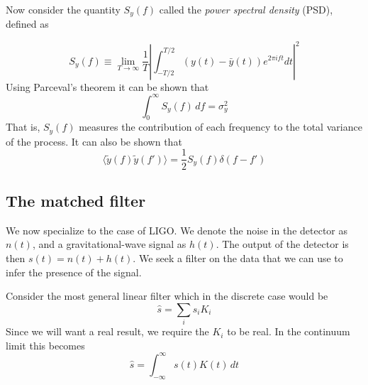 Now consider the quantity $S_y(f)$ called the \emph{power spectral
density} (PSD), defined as

\begin{equation}
\label{eq:psd1}
S_y(f) \equiv \lim_{T \to \infty} 
\frac{1}{T} \left| \int_{-T/2}^{T/2} (y(t) - \bar{y}(t))
e^{2 \pi i f t} dt \right|^2
\end{equation}
%
Using Parceval's theorem it can be shown that
%
\begin{equation*}
\int_0^\infty S_y(f)\, df = \sigma^2_y
\end{equation*}
%
That is, $S_y(f)$ measures the contribution of each frequency 
to the total variance of the process.
%
It can also be shown that 
%
\begin{equation}
\label{eq:psd2}
\langle \tilde{y}(f) \tilde{y}(f')\rangle = \frac{1}{2} S_y(f)
\delta(f-f')
\end{equation}

\subsection{The matched filter}
\label{ssec:matched_filter}

We now specialize to the case of LIGO.  We denote the noise in the
detector as $n(t)$, and a gravitational-wave signal as $h(t)$.  The
output of the detector is then $s(t)=n(t)+h(t)$.  We seek a filter on
the data that we can use to infer the presence of the signal.

Consider the most general linear filter which in the discrete case
would be
%
\begin{equation}
\hat{s} = \sum_i s_i K_i
\end{equation}
%
Since we will want a real result, we require the $K_i$ to be real.  In
the continuum limit this becomes
%
\begin{equation}
\hat{s} = \int_{-\infty}^\infty s(t) K(t)\, dt
\end{equation}

